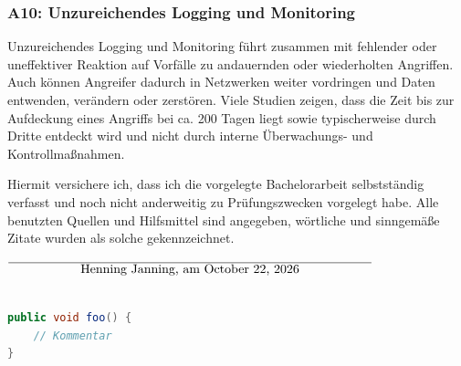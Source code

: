 \documentclass[12pt,oneside,a4paper,parskip]{scrbook}
\def\BaAuthor{Henning Janning}
\begin{document}
    \subsubsection{A10: Unzureichendes Logging und Monitoring}
    Unzureichendes Logging und Monitoring führt zusammen mit fehlender oder uneffektiver Reaktion auf Vorfälle zu andauernden oder wiederholten Angriffen. Auch können Angreifer dadurch in Netzwerken weiter vordringen und Daten entwenden, verändern oder zerstören. Viele Studien zeigen, dass die Zeit bis zur Aufdeckung eines Angriffs bei ca. 200 Tagen liegt sowie typischerweise durch Dritte entdeckt wird und nicht durch interne Überwachungs- und Kontrollmaßnahmen.

\cite{OWASPtop10}









Hiermit versichere ich, dass ich die vorgelegte Bachelorarbeit selbstständig verfasst und noch nicht anderweitig zu Prüfungszwecken vorgelegt habe. Alle benutzten Quellen und Hilfsmittel sind angegeben, wörtliche und sinngemäße Zitate wurden als solche gekennzeichnet.

\vspace{20pt}
\begin{flushright}
$\overline{~~~~~~~~~~~~~~~~~\mbox{\BaAuthor, am \today}~~~~~~~~~~~~~~~~~}$
\end{flushright}


\begin{lstlisting}[label=lst:java,
				   language=java,
				   firstnumber=1,
				   caption=Beispiel für einen Quelltext]

public void foo() {
	// Kommentar
}
\end{lstlisting}
\end{document}
